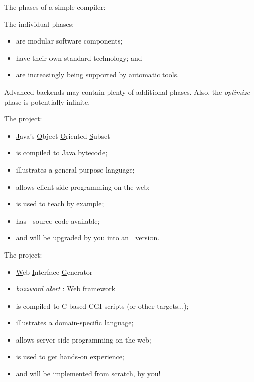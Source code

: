 \begin{slide*}
The phases of a simple compiler:\\

\begin{center}
\end{center}

The individual phases:
\begin{itemize}
\item are modular software components;
\item have their own standard technology; and
\item are increasingly being supported by automatic tools.
\end{itemize}

Advanced backends may contain plenty of additional phases. 
Also, the \emph{optimize} phase is potentially infinite.
\vfil
\end{slide*}
 
\begin{slide*}
The  project:
\begin{itemize}
\item \underline{J}ava's \underline{O}bject-\underline{O}riented \underline{S}ubset
\item is compiled to Java bytecode;
\item illustrates a general purpose language;
\item allows client-side programming on the web;
\item is used to teach by example;
\item has $\;$ source code available;
\item and will be upgraded by you into an $\;$ version.
\end{itemize}
\vfil
\end{slide*}
 
\begin{slide*}
The  project:
\begin{itemize}
\item \underline{W}eb \underline{I}nterface \underline{G}enerator
\item \emph{buzzword alert} : Web framework
\item is compiled to C-based CGI-scripts (or other targets...);
\item illustrates a domain-specific language;
\item allows server-side programming on the web;
\item is used to get hands-on experience;
\item and will be implemented from scratch, by you!
\end{itemize}
\vfil
\end{slide*}

